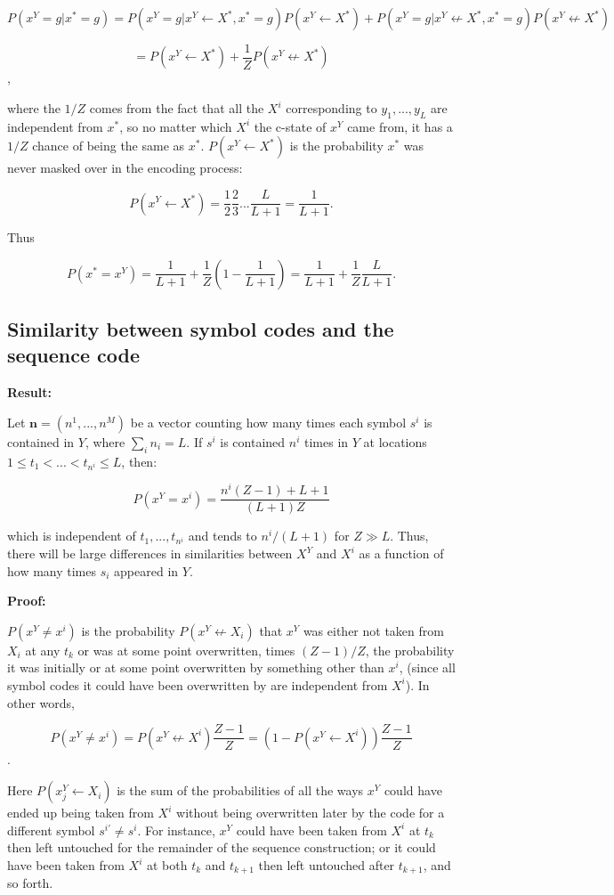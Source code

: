 \documentclass{article}
\begin{document}
$$P(x^Y = g|x^* = g) = P(x^Y = g|x^Y \leftarrow X^*, x^* = g)P(x^Y \leftarrow X^*) + P(x^Y = g|x^Y \not \leftarrow X^*, x^* = g)P(x^Y \not \leftarrow X^*)$$

$$= P(x^Y \leftarrow X^*) + \frac{1}{Z}P(x^Y \not \leftarrow X^*)$$,

where the $1/Z$ comes from the fact that all the $X^i$ corresponding to $y_1, ..., y_L$ are independent from $x^*$, so no matter which $X^i$ the c-state of $x^Y$ came from, it has a $1/Z$ chance of being the same as $x^*$. $P(x^Y \leftarrow X^*)$ is the probability $x^*$ was never masked over in the encoding process:

$$P(x^Y \leftarrow X^*) = \frac{1}{2}\frac{2}{3}...\frac{L}{L+1} = \frac{1}{L+1}.$$

Thus

$$P(x^* = x^Y) = \frac{1}{L+1} + \frac{1}{Z}\left(1 - \frac{1}{L+1}\right) = \frac{1}{L+1} + \frac{1}{Z}\frac{L}{L+1}.$$

\subsection{Similarity between symbol codes and the sequence code}

\textbf{Result:}

Let $\mathbf{n} = (n^1, ..., n^M)$ be a vector counting how many times each symbol $s^i$ is contained in $Y$, where $\sum\limits_i n_i = L.$
If $s^i$ is contained $n^i$ times in $Y$ at locations $1 \leq t_1 <  ... < t_{n^i} \leq L$, then:

$$P(x^Y = x^i) = \frac{n^i(Z-1) + L + 1}{(L+1)Z}$$

which is independent of $t_1, ..., t_{n^i}$ and tends to $n^i/(L+1)$ for $Z \gg L.$ Thus, there will be large differences in similarities between $X^Y$ and $X^i$ as a function of how many times $s_i$ appeared in $Y$.

\textbf{Proof:}

$P(x^Y \neq x^i)$ is the probability $P(x^Y \not\leftarrow X_i)$ that $x^Y$ was either not taken from $X_i$ at any $t_k$ or was at some point overwritten, times $(Z-1)/Z$, the probability it was initially or at some point overwritten by something other than $x^i$, (since all symbol codes it could have been overwritten by are independent from $X^i$). In other words, 

$$P(x^Y \neq x^i) = P(x^Y \not\leftarrow X^i)\frac{Z-1}{Z} = \left(1 - P(x^Y \leftarrow X^i)\right)\frac{Z-1}{Z} $$.

Here $P(x^Y_j \leftarrow X_i)$ is the sum of the probabilities of all the ways $x^Y$ could have ended up being taken from $X^i$ without being overwritten later by the code for a different symbol $s^{i'} \neq s^i$. For instance, $x^Y$ could have been taken from $X^i$ at $t_k$ then left untouched for the remainder of the sequence construction; or it could have been taken from $X^i$ at both $t_k$ and $t_{k+1}$ then left untouched after $t_{k+1}$, and so forth.
\end{document}
